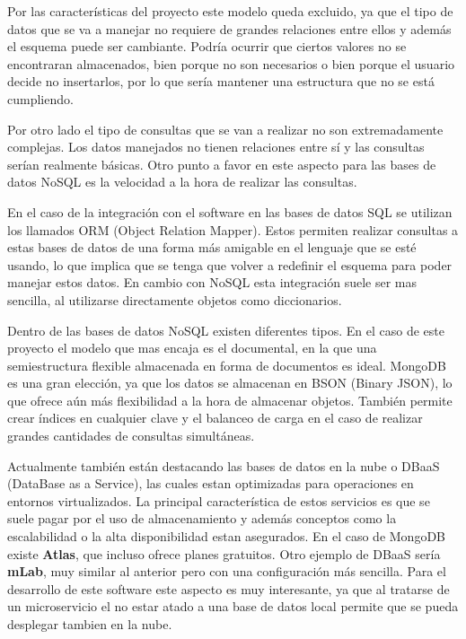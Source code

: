 Por las características del proyecto este modelo queda excluido, ya que el tipo de datos que se va a manejar no requiere de grandes relaciones entre ellos y además el esquema puede ser cambiante. Podría ocurrir que ciertos valores no se encontraran almacenados, bien porque no son necesarios o bien porque el usuario decide no insertarlos, por lo que sería mantener una estructura que no se está cumpliendo.

Por otro lado el tipo de consultas que se van a realizar no son extremadamente complejas. Los datos manejados no tienen relaciones entre sí y las consultas serían realmente básicas. Otro punto a favor en este aspecto para las bases de datos NoSQL es la velocidad a la hora de realizar las consultas.

En el caso de la integración con el software en las bases de datos SQL se utilizan los llamados ORM (Object Relation Mapper). Estos permiten realizar consultas a estas bases de datos de una forma más amigable en el lenguaje que se esté usando, lo que implica que se tenga que volver a redefinir el esquema para poder manejar estos datos. En cambio con NoSQL esta integración suele ser mas sencilla, al utilizarse directamente objetos como diccionarios.

Dentro de las bases de datos NoSQL existen diferentes tipos. En el caso de este proyecto el modelo que mas encaja es el documental, en la que una semiestructura flexible almacenada en forma de documentos es ideal. MongoDB es una gran elección, ya que los datos se almacenan en BSON (Binary JSON), lo que ofrece aún más flexibilidad a la hora de almacenar objetos. También permite crear índices en cualquier clave y el balanceo de carga en el caso de realizar grandes cantidades de consultas simultáneas.

Actualmente también están destacando las bases de datos en la nube o DBaaS (DataBase as a Service), las cuales estan optimizadas para operaciones en entornos virtualizados. La principal característica de estos servicios es que se suele pagar por el uso de almacenamiento y además conceptos como la escalabilidad o la alta disponibilidad estan asegurados. En el caso de MongoDB existe \textbf{Atlas}, que incluso ofrece planes gratuitos. Otro ejemplo de DBaaS sería \textbf{mLab}, muy similar al anterior pero con una configuración más sencilla. Para el desarrollo de este software este aspecto es muy interesante, ya que al tratarse de un microservicio el no estar atado a una base de datos local permite que se pueda desplegar tambien en la nube.
